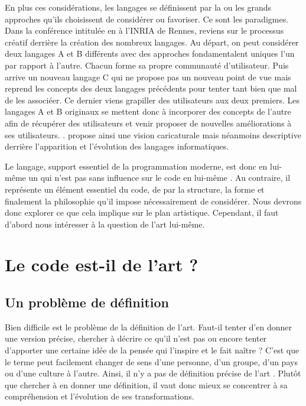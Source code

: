 \documentclass[12pt]{article} %
\begin{document}
En plus ces considérations, les langages se définissent par la ou les grands approches qu'ils choisissent de considérer ou favoriser. Ce sont les paradigmes. Dans la conférence intitulée  en  à l'INRIA de Rennes, \citeauthor{GerardBerry2015} reviens sur le processus créatif derrière la création des nombreux langages. Au départ, on peut considérer deux langages A et B différents avec des approches fondamentalent uniques l'un par rapport à l'autre. Chacun forme sa propre communauté d'utilisateur. Puis arrive un nouveau langage C qui ne propose pas un nouveau point de vue mais reprend les concepts des deux langages précédents pour tenter tant bien que mal de les associéer. Ce dernier viens grapiller des utilisateurs aux deux premiers. Les langages A et B originaux se mettent donc à incorporer des concepts de l'autre afin de récupérer des utilisateurs et venir proposer de nouvelles améliorations à ses utilisateurs. \cite{GerardBerry2015}. \citeauthor{GerardBerry2015} propose ainsi une vision caricaturale mais néanmoins descriptive derrière l'apparition et l'évolution des langages informatiques.

Le langage, support essentiel de la programmation moderne, est donc en lui-même un  \cite{GerardBerry2015} qui n'est pas sans influence sur le code en lui-même \cite{Dijkstra1976}. Au contraire, il représente un élément essentiel du code, de par la structure, la forme et finalement la philosophie qu'il impose nécessairement de considérer. Nous devrons donc explorer ce que cela implique sur le plan artistique. Cependant, il faut d'abord nous intéresser à la question de l'art lui-même.

\section{Le code est-il de l'art ?}

\subsection{Un problème de définition}
Bien difficile est le problème de la définition de l'art. Faut-il tenter d'en donner une version précise, chercher à décrire ce qu'il n'est pas ou encore tenter d'apporter une certaine idée de la pensée qui l'inspire et le fait naître ? C'est que le terme peut facilement changer de sens d'une personne, d'un groupe, d'un pays ou d'une culture à l'autre. Ainsi, il n'y a pas de définition précise de l'art \cite{SDavies1991}. Plutôt que chercher à en donner une définition, il vaut donc mieux se concentrer à sa compréhension et l'évolution de ses transformations. 
\end{document}

